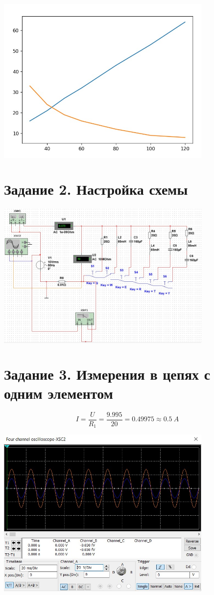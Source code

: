 \documentclass[14pt, a4paper]{article}
\begin{document}
        {
            \includegraphics[width=0.8\textwidth]{graph1.jpg}
            \centering
        }

    \section*{Задание 2. Настройка схемы}

        {
            \includegraphics[width=0.8\textwidth]{Design.jpg}
            \centering
        }

    \section*{Задание 3. Измерения в цепях с одним элементом}

        $$ I = \frac{U}{R_1} = \frac{9.995}{20} = 0.49975 \approx 0.5 \ A $$

        {
            \includegraphics[width=0.8\textwidth]{O1.jpg}
            \centering
        }
\end{document}
